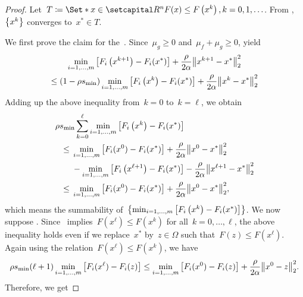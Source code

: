 \documentclass[../../main]{subfiles}
\begin{document}
\begin{proof}
    Let~$T \coloneqq \Set*{x \in \setR^n}{F(x) \le F\left(x^k\right), k = 0, 1, \dots}$.
    From ,~$\set*{x^k}$ converges to~$x^* \in T$.

    We first prove the claim for the~.
    Since~$\mu_g \ge 0$ and~$\mu_f + \mu_g \ge 0$,  yield
    \begin{multline}
        \min_{i = 1, \dots, m} \left[F_i\left(x^{k + 1}\right) - F_i(x^*)\right] + \frac{\rho}{2 \alpha} \norm*{x^{k + 1} - x^*}_2^2 \\
        \le \left(1 - \rho s_{\min}\right) \min_{i = 1, \dots, m} \left[F_i\left(x^k\right) - F_i(x^*)\right] + \frac{\rho}{2 \alpha} \norm*{x^k - x^*}_2^2
    \end{multline}
    Adding up the above inequality from~$k = 0$ to~$k = \ell$, we obtain
    \begin{align}
        \MoveEqLeft \rho s_{\min} \sum_{k = 0}^{\ell} \min_{i = 1, \dots, m} \left[F_i\left(x^k\right) - F_i(x^*)\right]                             \\
        \le{} & \min_{i = 1, \dots, m} \left[F_i(x^0) - F_i(x^*)\right] + \frac{\rho}{2 \alpha} \norm*{x^0 - x^*}_2^2                                \\
              & - \min_{i = 1, \dots, m} \left[F_i\left(x^{\ell + 1}\right) - F_i(x^*)\right] - \frac{\rho}{2 \alpha} \norm*{x^{\ell + 1} - x^*}_2^2 \\
        \le{} & \min_{i = 1, \dots, m} \left[F_i(x^0) - F_i(x^*)\right] + \frac{\rho}{2 \alpha} \norm*{x^0 - x^*}_2^2
        ,\end{align}
    which means the summability of~$\set*{\min_{i = 1, \dots, m} \left[F_i\left(x^k\right) - F_i(x^*)\right]}$.
    We now suppose .
    Since~ implies~$F\left(x^\ell\right) \le F\left(x^k\right)$ for all~$k = 0, \dots, \ell$, the above inequality holds even if we replace~$x^*$ by~$z \in \Omega$ such that~$F(z) \le F\left(x^\ell\right)$.
    Again using the relation~$F\left(x^\ell\right) \le F\left(x^k\right)$, we have
    \begin{multline}
        \rho s_{\min} (\ell + 1) \min_{i = 1, \dots, m} \left[ F_i(x^\ell) - F_i(z) \right] \le \min_{i = 1, \dots, m} \left[F_i(x^0) - F_i(z)\right] + \frac{\rho}{2 \alpha} \norm*{x^0 - z}_2^2
        .\end{multline}
    Therefore, we get

\end{proof}
\end{document}
